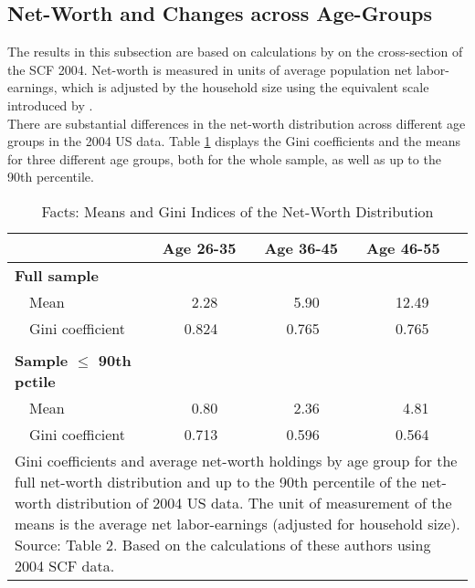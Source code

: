 \documentclass[a4paper,12pt,legno]{article}
\begin{document}
\subsection{Net-Worth and Changes across Age-Groups}
The results in this subsection are based on calculations by \cite{hintermaier2011} on the cross-section of the SCF 2004. Net-worth is measured in units of average population net labor-earnings, which is adjusted by the household size using the equivalent scale introduced by \cite{fernandez2007consumption}. \\
There are substantial differences in the net-worth distribution across different age groups in the 2004 US data. 
Table \ref{facts_changes} displays the Gini coefficients and the means for three different age groups, both for the whole sample, as well as up to the 90th percentile.\\ 

\begin{table}[!htbp]
\centering
\caption{Facts: Means and Gini Indices of the Net-Worth Distribution}
\label{facts_changes}
\begin{tabular}{@{}llll@{}}
\toprule
                     & Age 26-35 & Age 36-45 & Age 46-55 \\ \midrule
\textbf{Full sample}          &           &           &           \\
\ \ Mean                 & \ \ \ \ 2.28      & \ \ \ \ 5.90      & \ \ \ \ 12.49     \\
\ \ Gini coefficient     & \ \ \ 0.824     & \ \ \ 0.765     & \ \ \ \ 0.765     \\ \\
\textbf{Sample $\leq$ 90th pctile} &           &           &           \\
\ \ Mean                 & \ \ \ \ 0.80      & \ \ \ \ 2.36      & \ \ \ \ \ 4.81      \\
\ \ Gini coefficient     & \ \ \ 0.713     & \ \ \ 0.596     & \ \ \ \ 0.564     \\ \bottomrule
\multicolumn{4}{l}{%
  \begin{minipage}{11.5cm}%
    \small Gini coefficients and average net-worth holdings by age group for the full net-worth distribution and up to the 90th percentile of the net-worth distribution of 2004 US data. The unit of measurement of the means is the average net labor-earnings (adjusted for household size). Source: \cite{hintermaier2011} Table 2. Based on the calculations of these authors using 2004 SCF data. 
  \end{minipage}%
}\\
\end{tabular}
\end{table}
\end{document}
